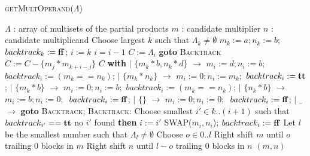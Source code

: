 \begin{algorithm}[t]
 \caption{\textsc{getMultOperand}($\Lambda$)}
 \label{alg:hb}
 \begin{algorithmic}[1]
   \Ensure $\Lambda$ : array of multisets of the partial products
   \State $m$ : candidate multiplier 
   \State $n$ : candidate multiplicand
   \State Choose largest $k$ such that $\Lambda_k\neq \emptyset$
   \State $m_k := a; n_k := b$; $backtrack_k := \mathbf{ff}$; 
   \Else
   \State {}
   \EndIf
   \State $i := k$
   \State $i = i - 1 $
   \State $C := \Lambda_i$
    {\bf goto }{\textsc{Backtrack}}
   \State $C := C - \{m_j*m_{k+i-j}\}$
   \EndIf
   \EndFor
    $C$ {\bf with}
   \State\quad $\mid$ $\{m_k*b,n_k*d\}$ $\rightarrow$ $m_i := d; n_i := b$;
   $backtrack_i := (m_k == n_k)$; 
   \State\quad $\mid$ $\{m_k*n_k\}$ $\rightarrow$ $m_i := 0; n_i := m_k;$
   $backtrack_i := \mathbf{tt}$; 
   \State \quad$\mid$ $\{m_k*b\}$ $\rightarrow$ $m_i := 0; n_i := b;$
   $backtrack_i := (m_k == n_k)$; 
   \State \quad $\mid$ $\{n_k*b\}$ $\rightarrow$ $m_i := b; n_i := 0;$\
   $backtrack_i := \mathbf{ff}$; 
   \State \quad $\mid$ $\{\}$ $\rightarrow$ $m_i := 0; n_i := 0;$\
   $backtrack_i := \mathbf{ff}$; 
   \State \quad $\mid$ $\_$ $\rightarrow$ {\bf goto }{\textsc{Backtrack}};
   \State {\bf continue;}
   \State \textsc{Backtrack:}
   \State \quad Choose smallest $i' \in k..(i+1)$ such that $backtrack_{i'} == \mathbf{tt}$
   \State \quad {\bf if} no $i'$ found {\bf then} 
   \State \quad $i := i'$
   \State \quad \textsc{SWAP}($m_i,n_i$); $backtrack_{i} := \mathbf{ff}$
   \EndWhile
   \State Let $l$ be the smallest number such that $\Lambda_l\neq \emptyset$
   \State Choose $o \in 0..l$
   \State Right shift $m$ until $o$ trailing $0$ blocks in $m$
   \State Right shift $n$ until $l-o$ trailing $0$ blocks in $n$
   \State \Return $(m,n)$
 \end{algorithmic}
\end{algorithm}  


